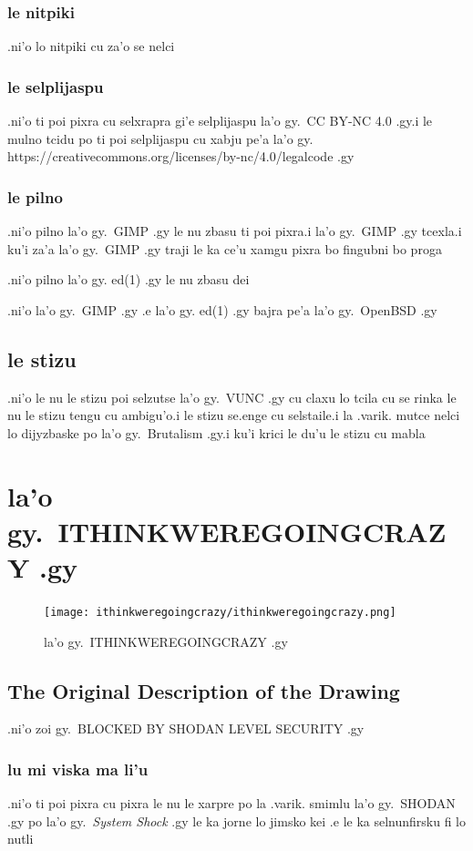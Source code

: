 \documentclass{report}
\begin{document}
\subsection{le nitpiki}
.ni'o lo nitpiki cu za'o se nelci
\subsection{le selplijaspu}
.ni'o ti poi pixra cu selxrapra gi'e selplijaspu la'o gy.\ CC BY-NC 4.0 .gy\@ .i le mulno tcidu po ti poi selplijaspu cu xabju pe'a la'o gy. https://creativecommons.org/licenses/by-nc/4.0/legalcode .gy
\subsection{le pilno}
.ni'o pilno la'o gy.\ GIMP .gy le nu zbasu ti poi pixra\@  .i la'o gy.\ GIMP .gy tcexla\@  .i ku'i za'a la'o gy.\ GIMP .gy traji le ka ce'u xamgu pixra bo fingubni bo proga

.ni'o pilno la'o gy. ed(1) .gy le nu zbasu dei

.ni'o la'o gy.\ GIMP .gy .e la'o gy. ed(1) .gy bajra pe'a la'o gy.\ OpenBSD .gy
\section{le stizu}
.ni'o le nu le stizu poi selzutse la'o gy.\ VUNC .gy cu claxu lo tcila cu se rinka le nu le stizu tengu cu ambigu'o\@  .i le stizu se.enge cu selstaile\@  .i la .varik. mutce nelci lo dijyzbaske po la'o gy.\ Brutalism .gy\@  .i ku'i krici le du'u le stizu cu mabla
\chapter{la'o gy.\ ITHINKWEREGOINGCRAZY .gy}
\begin{figure}[ht]
	\centering
	\texttt{[image: ithinkweregoingcrazy/ithinkweregoingcrazy.png]}
	\caption[center]{la'o gy.\ ITHINKWEREGOINGCRAZY .gy}
\end{figure}
\section{The Original Description of the Drawing}
.ni'o zoi gy.\ BLOCKED BY SHODAN LEVEL SECURITY .gy
\subsection{lu mi viska ma li'u}
.ni'o ti poi pixra cu pixra le nu le xarpre po la .varik. smimlu la'o gy.\ SHODAN .gy po la'o gy.\ \textit{System Shock} .gy le ka jorne lo jimsko kei .e le ka selnunfirsku fi lo nutli
\end{document}
